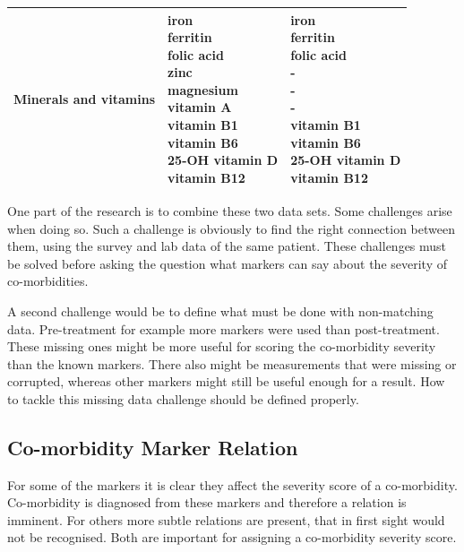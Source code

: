 \documentclass[10pt,a4paper]{article}
\begin{document}
\begin{table}
\begin{tabular}{lll}
			Minerals and vitamins & \makecell{iron\\ferritin\\folic acid\\zinc\\magnesium\\vitamin A\\vitamin B1\\vitamin B6\\25-OH vitamin D\\vitamin B12}                                        & \makecell{iron\\ferritin\\folic acid\\-\\-\\-\\vitamin B1\\vitamin B6\\25-OH vitamin D\\vitamin B12}                                                           \\ \hline
		\end{tabular}
	\end{table}
	
	One part of the research is to combine these two data sets. Some challenges arise when doing so. Such a challenge is obviously to find the right connection between them, using the survey and lab data of the same patient. These challenges must be solved before asking the question what markers can say about the severity of co-morbidities.
	
	A second challenge would be to define what must be done with non-matching data. Pre-treatment for example more markers were used than post-treatment. These missing ones might be more useful for scoring the co-morbidity severity than the known markers. There also might be measurements that were missing or corrupted, whereas other markers might still be useful enough for a result. How to tackle this missing data challenge should be defined properly.
	
	\subsection{Co-morbidity Marker Relation}
	\label{subsec:CoMorMarkRel}
		
	For some of the markers it is clear they affect the severity score of a co-morbidity. Co-morbidity is diagnosed from these markers and therefore a relation is imminent. For others more subtle relations are present, that in first sight would not be recognised. Both are important for assigning a co-morbidity severity score.
	
\end{document}
